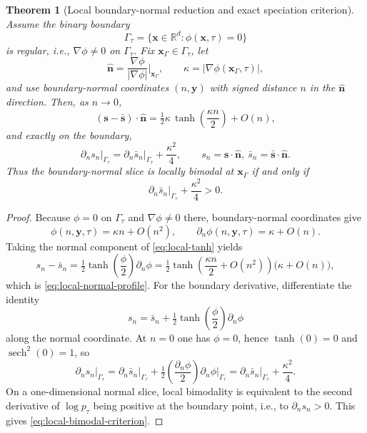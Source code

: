 \documentclass[11pt]{article}
\newtheorem{theorem}{Theorem}[section]
\newcommand{\R}{\mathbb{R}}
\begin{document}
\begin{theorem}[Local boundary-normal reduction and exact speciation criterion]\label{thm:local-speciation}
Assume the binary boundary
\begin{equation}\label{eq:binary-boundary}
  \Gamma_\tau = \{\bm{x}\in\R^d : \phi(\bm{x},\tau)=0\}
\end{equation}
is regular, i.e., $\nabla\phi\neq 0$ on $\Gamma_\tau$.
Fix $\bm{x}_\Gamma\in\Gamma_\tau$, let
\begin{equation}\label{eq:kappa-def}
  \hat{\bm{n}} = \frac{\nabla\phi}{|\nabla\phi|}\Big|_{\bm{x}_\Gamma},
  \qquad
  \kappa = |\nabla\phi(\bm{x}_\Gamma,\tau)|,
\end{equation}
and use boundary-normal coordinates $(n,\bm{y})$ with signed distance $n$ in the $\hat{\bm{n}}$ direction.
Then, as $n\to 0$,
\begin{equation}\label{eq:local-normal-profile}
  (\bm{s}-\bar{\bm{s}})\cdot\hat{\bm{n}}
  = \tfrac{1}{2}\kappa\,\tanh\!\left(\frac{\kappa n}{2}\right) + O(n),
\end{equation}
and exactly on the boundary,
\begin{equation}\label{eq:local-normal-criterion}
  \partial_n s_n\big|_{\Gamma_\tau}
  = \partial_n \bar s_n\big|_{\Gamma_\tau} + \frac{\kappa^2}{4},
  \qquad s_n = \bm{s}\cdot\hat{\bm{n}},\ \bar s_n = \bar{\bm{s}}\cdot\hat{\bm{n}}.
\end{equation}
Thus the boundary-normal slice is locally bimodal at $\bm{x}_\Gamma$ if and only if
\begin{equation}\label{eq:local-bimodal-criterion}
  \partial_n \bar s_n\big|_{\Gamma_\tau} + \frac{\kappa^2}{4} > 0.
\end{equation}
\end{theorem}

\begin{proof}
Because $\phi=0$ on $\Gamma_\tau$ and $\nabla\phi\neq 0$ there, boundary-normal coordinates give
\[
  \phi(n,\bm{y},\tau) = \kappa n + O(n^2),
  \qquad
  \partial_n\phi(n,\bm{y},\tau) = \kappa + O(n).
\]
Taking the normal component of \eqref{eq:local-tanh} yields
\[
  s_n - \bar s_n
  = \tfrac{1}{2}\tanh\!\left(\frac{\phi}{2}\right)\partial_n\phi
  = \tfrac{1}{2}\tanh\!\left(\frac{\kappa n}{2} + O(n^2)\right)\bigl(\kappa + O(n)\bigr),
\]
which is \eqref{eq:local-normal-profile}.
For the boundary derivative, differentiate the identity
\[
  s_n = \bar s_n + \tfrac{1}{2}\tanh\!\left(\frac{\phi}{2}\right)\partial_n\phi
\]
along the normal coordinate.
At $n=0$ one has $\phi=0$, hence $\tanh(0)=0$ and $\operatorname{sech}^2(0)=1$, so
\[
  \partial_n s_n\big|_{\Gamma_\tau}
  = \partial_n \bar s_n\big|_{\Gamma_\tau}
    + \tfrac{1}{2}\left(\frac{\partial_n\phi}{2}\right)\partial_n\phi\Big|_{\Gamma_\tau}
  = \partial_n \bar s_n\big|_{\Gamma_\tau} + \frac{\kappa^2}{4}.
\]
On a one-dimensional normal slice, local bimodality is equivalent to the second derivative of $\log p_\tau$ being positive at the boundary point, i.e., to $\partial_n s_n>0$.
This gives \eqref{eq:local-bimodal-criterion}.
\end{proof}
\end{document}
